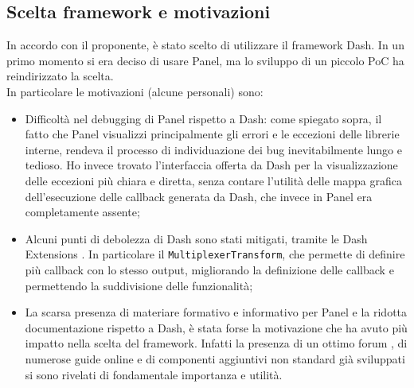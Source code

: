 \subsection{Scelta framework e motivazioni}
In accordo con il proponente, è stato scelto di utilizzare il framework Dash. In un primo momento si era deciso di usare Panel, ma lo sviluppo di un piccolo \gls{PoC} ha reindirizzato la scelta.
\\
In particolare le motivazioni (alcune personali) sono:
\begin{itemize}
\item Difficoltà nel debugging di Panel rispetto a Dash: come spiegato sopra, il fatto che Panel visualizzi principalmente gli errori e le eccezioni delle librerie interne, rendeva il processo di individuazione dei bug inevitabilmente lungo e tedioso. Ho invece trovato l'interfaccia offerta da Dash per la visualizzazione delle eccezioni più chiara e diretta, senza contare l'utilità delle mappa grafica dell'esecuzione delle callback generata da Dash, che invece in Panel era completamente assente;

\item Alcuni punti di debolezza di Dash sono stati mitigati, tramite le Dash Extensions \cite{site:dash-ext}. In particolare il \texttt{MultiplexerTransform}, che permette di definire più callback con lo stesso output, migliorando la definizione delle callback e permettendo la suddivisione delle funzionalità;

\item La scarsa presenza di materiare formativo e informativo per Panel e la ridotta documentazione rispetto a Dash, è stata forse la motivazione che ha avuto più impatto nella scelta del framework. Infatti la presenza di un ottimo forum \cite{site:dash-forum}, di numerose guide online e di componenti aggiuntivi non standard già sviluppati si sono rivelati di fondamentale importanza e utilità.

\end{itemize}

